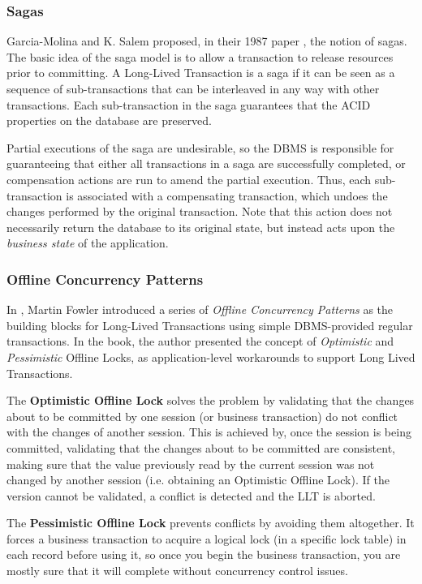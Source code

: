 \documentclass{llncs}
\begin{document}
\subsubsection{Sagas}
\label{sec:sagas}

Garcia-Molina and K. Salem proposed, in their 1987 paper
\cite{garcia1987sagas}, the notion of sagas. The basic idea of the
saga model is to allow a transaction to release resources prior to
committing. A Long-Lived Transaction is a saga if it can be seen as a
sequence of sub-transactions that can be interleaved in any way with
other transactions. Each sub-transaction in the saga guarantees that
the ACID properties on the database are preserved.

Partial executions of the saga are undesirable, so the DBMS is
responsible for guaranteeing that either all transactions in a saga
are successfully completed, or compensation actions are run to amend
the partial execution. Thus, each sub-transaction is associated with a
compensating transaction, which undoes the changes performed by the
original transaction. Note that this action does not necessarily
return the database to its original state, but instead acts upon the
{\it business state} of the application.

\subsubsection{Offline Concurrency Patterns}

In \cite{fowler2003patterns}, Martin Fowler introduced a series of
{\it Offline Concurrency Patterns} as the building blocks for
Long-Lived Transactions using simple DBMS-provided regular
transactions. In the book, the author presented the concept of {\it
  Optimistic} and {\it Pessimistic} Offline Locks, as
application-level workarounds to support Long Lived Transactions.

The {\bf Optimistic Offline Lock} solves the problem by validating
that the changes about to be committed by one session (or business
transaction) do not conflict with the changes of another session. This
is achieved by, once the session is being committed, validating that
the changes about to be committed are consistent, making sure that the
value previously read by the current session was not changed by
another session (i.e. obtaining an Optimistic Offline Lock). If the
version cannot be validated, a conflict is detected and the LLT is aborted.

The {\bf Pessimistic Offline Lock} prevents conflicts by avoiding them
altogether. It forces a business transaction to acquire a logical lock
(in a specific lock table) in each record before using it, so once you
begin the business transaction, you are mostly sure that it will
complete without concurrency control issues.
\end{document}
